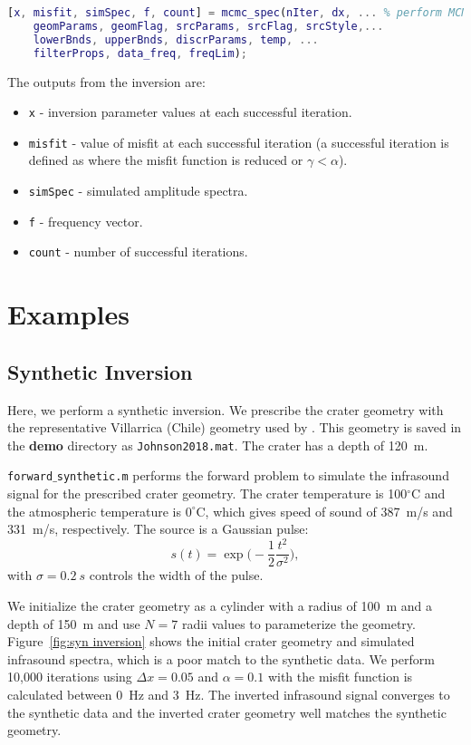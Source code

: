 \documentclass[10pt]{article}
\begin{document}
\begin{lstlisting}[language=Matlab]
[x, misfit, simSpec, f, count] = mcmc_spec(nIter, dx, ... % perform MCMC inversion
    geomParams, geomFlag, srcParams, srcFlag, srcStyle,...
    lowerBnds, upperBnds, discrParams, temp, ...
    filterProps, data_freq, freqLim);
\end{lstlisting}

The outputs from the inversion are:
\begin{itemize}
\item \texttt{x} - inversion parameter values at each successful iteration. 
\item \texttt{misfit} - value of misfit at each successful iteration (a successful iteration is defined as where the misfit function is reduced or $\gamma < \alpha$).
\item \texttt{simSpec} - simulated amplitude spectra.
\item \texttt{f} - frequency vector.
\item \texttt{count} - number of successful iterations.
\end{itemize}


\section{Examples}
\subsection{Synthetic Inversion}
Here, we perform a synthetic inversion. We prescribe the crater geometry with the representative Villarrica (Chile) geometry used by \cite{Johnson2018_Villarrica}. This geometry is saved in the {\bf demo} directory as  \texttt{Johnson2018.mat}. The crater has a depth of 120~m.

\texttt{forward$\_$synthetic.m} performs the forward problem to simulate the infrasound signal for the prescribed crater geometry. The crater temperature is 100$^\circ$C and the atmospheric temperature is $0^\circ$C, which gives speed of sound of 387~m/s and 331~m/s, respectively. The source is a Gaussian pulse:
\begin{equation}
s(t) = \exp \bigg( -\frac{1}{2} \frac{t^2}{\sigma^2} \bigg),
\end{equation}
with $\sigma=0.2~s$ controls the width of the pulse. 

We initialize the crater geometry as a cylinder with a radius of 100~m and a depth of 150~m and use $N=7$ radii values to parameterize the geometry. Figure~\ref{fig:syn inversion} shows the initial crater geometry and simulated infrasound spectra, which is a poor match to the synthetic data. We perform 10,000 iterations using $\Delta x=0.05$ and $\alpha=0.1$ with the misfit function is calculated between 0~Hz and 3~Hz. The inverted infrasound signal converges to the synthetic data and the inverted crater geometry well matches the synthetic geometry.
\end{document}

